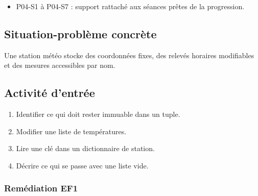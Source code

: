 \begin{itemize}
\tightlist
\item
  P04-S1 à P04-S7 : support rattaché aux séances prêtes de la
  progression.
\end{itemize}

\subsection{Situation-problème concrète}

Une station météo stocke des coordonnées fixes, des relevés horaires
modifiables et des mesures accessibles par nom.

\subsection{Activité d’entrée}

\begin{enumerate}
\def\labelenumi{\arabic{enumi}.}
\tightlist
\item
  Identifier ce qui doit rester immuable dans un tuple.
\item
  Modifier une liste de températures.
\item
  Lire une clé dans un dictionnaire de station.
\item
  Décrire ce qui se passe avec une liste vide.
\end{enumerate}

\subsubsection{Remédiation EF1}

